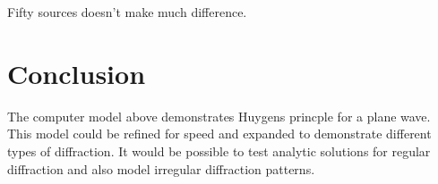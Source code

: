 \documentclass{article}
\begin{document}
    Fifty sources doesn't make much difference.

    \section{Conclusion}\label{conclusion}

The computer model above demonstrates Huygens princple for a plane wave.
This model could be refined for speed and expanded to demonstrate
different types of diffraction. It would be possible to test analytic
solutions for regular diffraction and also model irregular diffraction
patterns.





    
\end{document}
